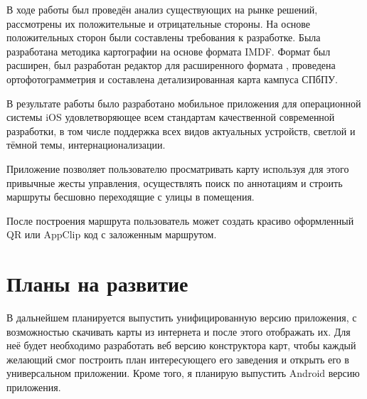 В ходе работы был проведён анализ существующих на рынке решений, рассмотрены их положительные и отрицательные стороны. На основе положительных сторон были составлены требования к разработке. Была разработана методика картографии на основе формата IMDF. Формат был расширен, был разработан редактор для расширенного формата , проведена ортофотограмметрия  и составлена детализированная карта кампуса СПбПУ.

В результате работы было разработано мобильное приложения для операционной системы iOS удовлетворяющее всем стандартам качественной современной разработки, в том числе поддержка всех видов актуальных устройств, светлой и тёмной темы, интернационализации.

Приложение позволяет пользователю просматривать карту используя для этого привычные жесты управления, осуществлять поиск по аннотациям и строить маршруты бесшовно переходящие с улицы в помещения.

После построения маршрута пользователь может создать красиво оформленный QR или AppClip код с заложенным маршрутом.


\section*{Планы на развитие}
  В дальнейшем планируется выпустить унифицированную версию приложения, с возможностью скачивать карты из интернета и после этого отображать их. Для неё будет необходимо разработать веб версию конструктора карт, чтобы каждый желающий смог построить план интересующего его заведения и открыть его в универсальном приложении. Кроме того, я планирую выпустить Android версию приложения.
